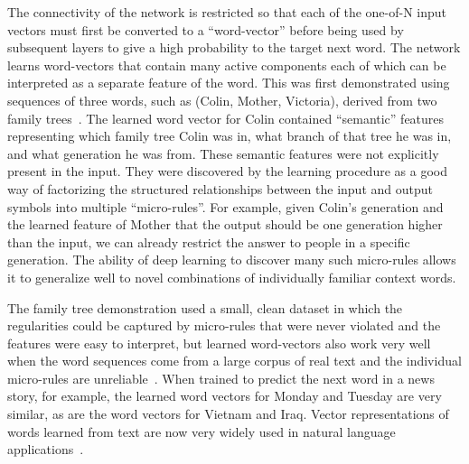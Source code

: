 \documentclass[10pts]{article}
\begin{document}
The connectivity of the network is restricted so that each of the one-of-N
input vectors must first be converted to a ``word-vector'' before being
used by subsequent layers to give a high probability to the target next
word.  The network learns word-vectors that contain many active components
each of which can be interpreted as a separate feature of the word. This
was first demonstrated using sequences of three words, such as
(Colin, Mother, Victoria), derived from two family trees~\citep{RHW}. The learned word
vector for Colin contained ``semantic'' features representing which family
tree Colin was in, what branch of that tree he was in, and what generation
he was from. 
These semantic features were not explicitly present
in the input.  They were discovered by the learning procedure as a good way
of factorizing the structured relationships between the input and output
symbols into multiple ``micro-rules''.  For example, given Colin's
generation and the learned feature of Mother that the output should be one
generation higher than the input, we can already restrict the answer to
people in a specific generation. The ability of deep learning to discover
many such micro-rules allows it to generalize well to novel combinations of
individually familiar context words.

The family tree demonstration used a small, clean dataset in which the
regularities could be captured by micro-rules that were never violated and
the features were easy to interpret, but learned word-vectors also work
very well when the word sequences come from a large corpus of real text and
the individual micro-rules are unreliable~\citep{BenDucVin01-short}. When trained to
predict the next word in a news story, for example, the learned word
vectors for Monday and Tuesday are very similar, as are the word vectors
for Vietnam and Iraq.  Vector representations of words learned from text
are now very widely used in natural language 
applications~\citep{Schwenk-2007,collobert:2011b,Socher-2011,Mikolov-et-al-NIPS2013}.
\end{document}
